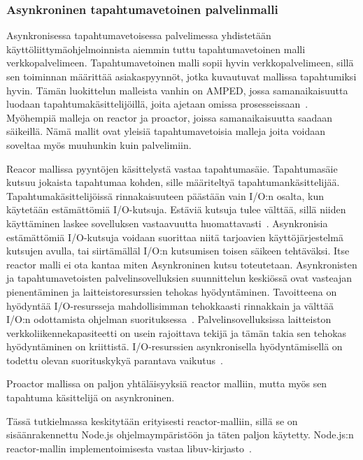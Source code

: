 \documentclass[12pt]{article}
\begin{document}
\subsubsection{Asynkroninen tapahtumavetoinen palvelinmalli}

Asynkronisessa tapahtumavetoisessa palvelimessa yhdistetään
käyttöliittymäohjelmoinnista aiemmin tuttu tapahtumavetoinen malli
verkkopalvelimeen. Tapahtumavetoinen malli sopii hyvin verkkopalvelimeen,
sillä sen toiminnan määrittää asiakaspyynnöt, jotka
kuvautuvat mallissa tapahtumiksi hyvin.
Tämän luokittelun malleista vanhin on AMPED, jossa
samanaikaisuutta luodaan tapahtumakäsittelijöillä, joita
ajetaan omissa prosesseissaan~\cite{pai_flash:_1999}.
Myöhempiä malleja on reactor ja proactor, joissa samanaikaisuutta
saadaan säikeillä. Nämä mallit ovat yleisiä tapahtumavetoisia malleja
joita voidaan soveltaa myös muuhunkin kuin palvelimiin.

Reacor mallissa pyyntöjen käsittelystä
vastaa tapahtumasäie.
Tapahtumasäie kutsuu jokaista tapahtumaa kohden, sille
määriteltyä tapahtumankäsittelijää.
Tapahtumakäsittelijöissä rinnakaisuuteen päästään
vain I/O:n osalta, kun käytetään estämättömiä
I/O-kutsuja.
Estäviä kutsuja tulee välttää,
sillä niiden käyttäminen laskee sovelluksen
vastaavuutta huomattavasti~\cite{schmidt_reactor:_1995}.
Asynkronisia estämättömiä I/O-kutsuja 
voidaan suorittaa niitä tarjoavien käyttöjärjestelmä kutsujen
avulla, tai siirtämälläl I/O:n kutsumisen toisen säikeen tehtäväksi.
Itse reactor malli ei ota kantaa miten Asynkroninen kutsu toteutetaan.
Asynkronisten ja tapahtumavetoisten palvelinsovelluksien suunnittelun keskiössä
ovat vasteajan pienentäminen ja laitteistoresurssien tehokas hyödyntäminen.
Tavoitteena on hyödyntää I/O-resursseja mahdollisimman tehokkaasti
rinnakkain ja välttää I/O:n odottamista ohjelman suorituksessa~\cite{pai_flash:_1999}.
Palvelinsovelluksissa
laitteiston verkkoliikennekapasiteetti on usein rajoittava tekijä ja tämän takia
sen tehokas hyödyntäminen on kriittistä. I/O-resurssien asynkronisella hyödyntämisellä on todettu
olevan suorituskykyä parantava vaikutus~\cite{hu_applying_1998}.

Proactor mallissa on paljon yhtäläisyyksiä reactor malliin, mutta myös sen
tapahtuma käsittelijä on asynkroninen.

 Tässä tutkielmassa keskitytään erityisesti
reactor-malliin, sillä se on sisäänrakennettu Node.js ohjelmaympäristöön ja
täten paljon käytetty. Node.js:n reactor-mallin implementoimisesta vastaa
libuv-kirjasto~\cite{libuv_design_2019}.
\end{document}
